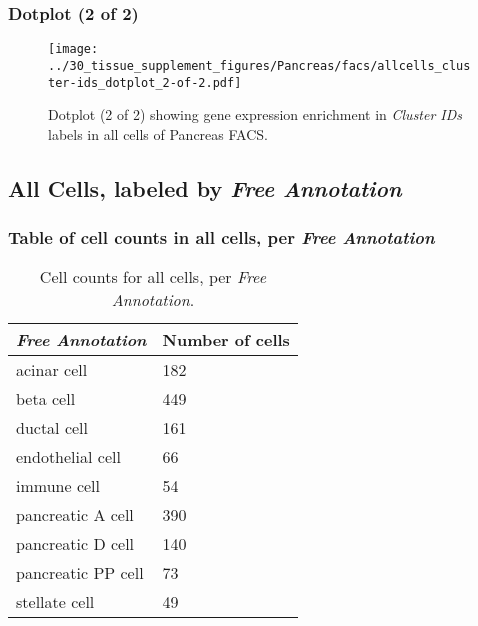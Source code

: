 \clearpage

\subsubsection{Dotplot (2 of 2)}
\begin{figure}[h]
\centering
\texttt{[image: ../30\_tissue\_supplement\_figures/Pancreas/facs/allcells\_cluster-ids\_dotplot\_2-of-2.pdf]}

\caption{ Dotplot (2 of 2)  showing gene expression enrichment in \emph{Cluster IDs} labels in all cells of Pancreas FACS. }
\end{figure}


\clearpage

\subsection{All Cells, labeled by \emph{Free Annotation}}
\subsubsection{Table of cell counts in all cells, per \emph{Free Annotation}}\begin{table}[h]
\centering
\label{my-label}
\begin{tabular}{@{}ll@{}}
\toprule

\emph{Free Annotation}& Number of cells \\ \midrule
acinar cell & 182 \\

beta cell & 449 \\

ductal cell & 161 \\

endothelial cell & 66 \\

immune cell & 54 \\

pancreatic A cell & 390 \\

pancreatic D cell & 140 \\

pancreatic PP cell & 73 \\

stellate cell & 49 \\
\bottomrule
\end{tabular}
\caption{Cell counts for all cells, per \emph{Free Annotation}.}
\end{table}

